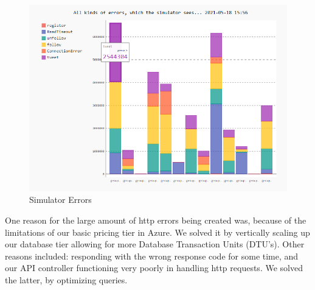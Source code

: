 \documentclass{article}
\begin{document}
\begin{figure}[H]
\centering
\includegraphics[width=1\textwidth]{images/simulatorerr.png}
\caption{\label{fig:sim} Simulator Errors}
\end{figure}

One reason for the large amount of http errors being created was, because of the limitations of our basic pricing tier in Azure. We solved it by vertically scaling up our database tier allowing for more Database Transaction Units (DTU's). Other reasons included: responding with the wrong response code for some time, and our API controller functioning very poorly in handling http requests. We solved the latter, by optimizing queries.


\newpage


\end{document}
